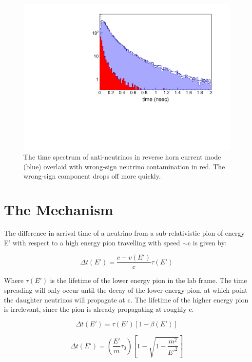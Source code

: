 \documentclass[preprint,12pt]{elsarticle}
\begin{document}
\begin{figure}[t]
	\begin{center}
           	\includegraphics[width=0.8 \linewidth]{Figures/2018.11.07_LBNFtimingRHC/RHCbeamcontent_log.pdf}
	\end{center}
	\caption{The time spectrum of anti-neutrinos in reverse horn current mode (blue) overlaid with wrong-sign neutrino contamination in red. The wrong-sign component drops off more quickly.}
		\label{fig:anniedetector}
\end{figure}

\section{The Mechanism}

The difference in arrival time of a neutrino from a sub-relativistic pion of energy E' with respect to a high energy pion travelling with speed $\sim$c is given by:

\begin{equation}
\Delta t(E') = \frac{c - v(E')}{c} \tau (E')
\end{equation}

Where $\tau (E')$ is the lifetime of the lower energy pion in the lab frame. The time spreading will only occur until the decay of the lower energy pion, at which point the daughter neutrinos will propagate at c. The lifetime of the higher energy pion is irrelevant, since the pion is already propagating at roughly c.

\begin{equation}
\Delta t(E') = \tau (E') [1 - \beta (E')]
\end{equation}

\begin{equation}
\Delta t(E') = (\frac{E'}{m} \tau_0) [1 - \sqrt{ 1 - \frac{m^2}{E'^2}}]
\end{equation}
\end{document}
